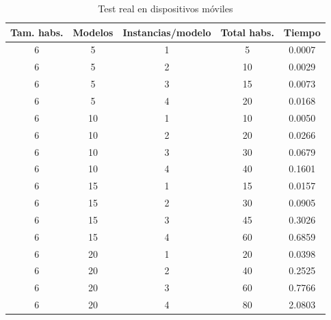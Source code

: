 \begin{table}[H]
\begin{center}
	\begin{tabular}{ | c | c | c | c | c | }
\hline
Tam. habs. & Modelos & Instancias/modelo & Total habs. & Tiempo \\ \hline 
6 & 5 & 1 & 5 & 0.0007 \\ 
6 & 5 & 2 & 10 & 0.0029 \\ 
6 & 5 & 3 & 15 & 0.0073 \\ 
6 & 5 & 4 & 20 & 0.0168 \\ 
6 & 10 & 1 & 10 & 0.0050 \\ 
6 & 10 & 2 & 20 & 0.0266 \\ 
6 & 10 & 3 & 30 & 0.0679 \\ 
6 & 10 & 4 & 40 & 0.1601 \\ 
6 & 15 & 1 & 15 & 0.0157 \\ 
6 & 15 & 2 & 30 & 0.0905 \\ 
6 & 15 & 3 & 45 & 0.3026 \\ 
6 & 15 & 4 & 60 & 0.6859 \\ 
6 & 20 & 1 & 20 & 0.0398 \\ 
6 & 20 & 2 & 40 & 0.2525 \\ 
6 & 20 & 3 & 60 & 0.7766 \\ 
6 & 20 & 4 & 80 & 2.0803 \\ 
\hline
	\end{tabular}
\end{center}
\caption{Test real en dispositivos móviles}
\label{table:optreal}
\end{table}

